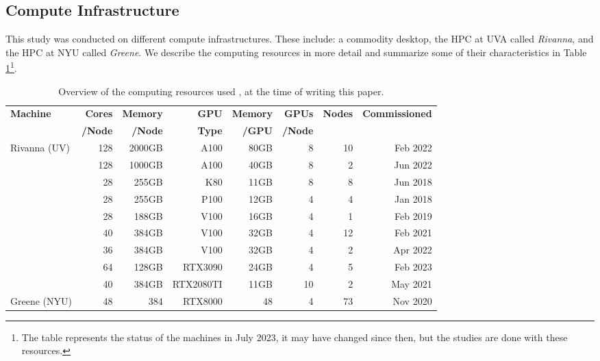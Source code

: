 \documentclass[sigplan,screen]{acmart}
\begin{document}
\subsection{Compute Infrastructure}
\label{sec:hw}

This study was conducted on different compute infrastructures. These include: a commodity desktop, the HPC at UVA called {\em Rivanna}, and the HPC at NYU called {\em Greene}. We describe the computing resources in more detail and summarize some of their characteristics in Table \ref{tab:hwoverview}\footnote{The table represents the status of the machines in July 2023, it may have changed since then, but the studies are done with these resources.}.


\begin{table}[htb]
    \caption{Overview of the computing resources used \cite{las23-cloudmask}, at the time of writing this paper.}
    \label{tab:hwoverview}
    \begin{center}
    \begin{tabular}{|l|r|r|r|r|r|r|r|}
        \hline
            {\bf Machine}  & {\bf Cores} & {\bf Memory} & {\bf GPU}   &   {\bf Memory} & {\bf GPUs} & {\bf Nodes}  & {\bf Commissioned} \\ 
                     &  {\bf /Node} & {\bf /Node}  &  {\bf Type}  & {\bf /GPU}     &   {\bf /Node}        & & \\
        \hline
        \hline
        Rivanna (UV)    & 128 & 2000GB   & A100 & 80GB &  8  & 10 & Feb 2022 \\
                        & 128 & 1000GB   & A100 & 40GB &  8  &  2 & Jun 2022 \\   
                        & 28  & 255GB    & K80  & 11GB &  8  &  8 & Jun 2018 \\
                        & 28  & 255GB    & P100 & 12GB &  4  &  4 & Jan 2018 \\
                        & 28  & 188GB    & V100 & 16GB &  4  &  1 & Feb 2019 \\
                        & 40  & 384GB    & V100 & 32GB &  4  & 12 & Feb 2021 \\
                        & 36  & 384GB    & V100 & 32GB &  4  &  2 & Apr 2022 \\
                        &  64 & 128GB     & RTX3090   & 24GB    & 4   &  5 & Feb 2023         \\
                        & 40  & 384GB    & RTX2080TI & 11GB & 10  &  2 & May 2021 \\
         \hline
         Greene (NYU)	& 48	& 384	& RTX8000 	& 48	& 4	& 73 & Nov 2020\\

\end{tabular}
\end{center}
\end{table}
\end{document}
